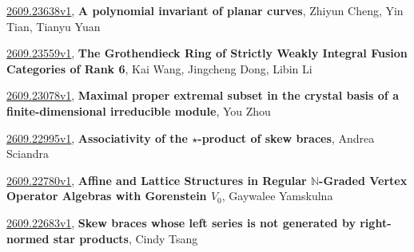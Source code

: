 \documentclass[9pt, a4paper]{article}
\theoremstyle{plain}
\theoremstyle{definition}
\theoremstyle{remark}
\newcommand{\arxiv}[3]{\href{https://arxiv.org/abs/#1}{#1}, \textbf{\textcolor{arxivblue}{#2}}, #3}
\begin{document}
\arxiv{2609.23638v1}{A polynomial invariant of planar curves}{Zhiyun Cheng, Yin Tian, Tianyu Yuan}

\arxiv{2609.23559v1}{The Grothendieck Ring of Strictly Weakly Integral Fusion Categories of Rank 6}{Kai Wang, Jingcheng Dong, Libin Li}

\arxiv{2609.23078v1}{Maximal proper extremal subset in the crystal basis of a finite-dimensional irreducible module}{You Zhou}

\arxiv{2609.22995v1}{Associativity of the $\star$-product of skew braces}{Andrea Sciandra}

\arxiv{2609.22780v1}{Affine and Lattice Structures in Regular $\mathbb{N}$-Graded Vertex Operator Algebras with Gorenstein $V_0$}{Gaywalee Yamskulna}

\arxiv{2609.22683v1}{Skew braces whose left series is not generated by right-normed star products}{Cindy Tsang}

\end{document}
